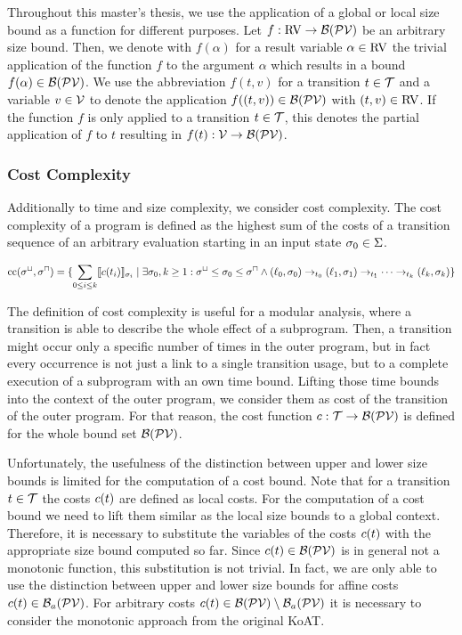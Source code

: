 Throughout this master's thesis, we use the application of a global or local size bound as a function for different purposes.
Let $f: \text{RV} \rightarrow \mathcal{B}(\mathcal{PV})$ be an arbitrary size bound.
Then, we denote with $f(\alpha)$ for a result variable $\alpha \in \text{RV}$ the trivial application of the function $f$ to the argument $\alpha$ which results in a bound $f(\alpha) \in \mathcal{B}(\mathcal{PV})$.
We use the abbreviation $f(t, v)$ for a transition $t \in \mathcal{T}$ and a variable $v \in \mathcal{V}$ to denote the application $f((t,v)) \in \mathcal{B}(\mathcal{PV})$ with $(t,v) \in \text{RV}$.
If the function $f$ is only applied to a transition $t \in \mathcal{T}$, this denotes the partial application of $f$ to $t$ resulting in $f(t): \mathcal{V} \rightarrow \mathcal{B}(\mathcal{PV})$.

\subsubsection{Cost Complexity}

Additionally to time and size complexity, we consider cost complexity.
The cost complexity of a program is defined as the highest sum of the costs of a transition sequence of an arbitrary evaluation starting in an input state $\sigma_0 \in \Sigma$.

\begin{definition}
\[ \text{cc}({\sigma^\sqcup}, {\sigma^\sqcap}) = \lbrace  \sum_{0 \leq i \leq k} \llbracket c(t_i) \rrbracket_{\sigma_i} \mid \exists \sigma_0, k \geq 1: \sigma^\sqcup \leq \sigma_0 \leq \sigma^\sqcap \wedge (\ell_0, \sigma_0) \rightarrow_{t_0} (\ell_1, \sigma_1) \rightarrow_{t_1} \dots \rightarrow_{t_k} (\ell_k, \sigma_k)  \rbrace \]
\end{definition}

The definition of cost complexity is useful for a modular analysis, where a transition is able to describe the whole effect of a subprogram.
Then, a transition might occur only a specific number of times in the outer program, but in fact every occurrence is not just a link to a single transition usage, but to a complete execution of a subprogram with an own time bound.
Lifting those time bounds into the context of the outer program, we consider them as cost of the transition of the outer program. 
For that reason, the cost function $c: \mathcal{T} \rightarrow \mathcal{B}(\mathcal{PV})$ is defined for the whole bound set $\mathcal{B}(\mathcal{PV})$.

Unfortunately, the usefulness of the distinction between upper and lower size bounds is limited for the computation of a cost bound.
Note that for a transition $t \in \mathcal{T}$ the costs $c(t)$ are defined as local costs.
For the computation of a cost bound we need to lift them similar as the local size bounds to a global context.
Therefore, it is necessary to substitute the variables of the costs $c(t)$ with the appropriate size bound computed so far.
Since $c(t) \in \mathcal{B}(\mathcal{PV})$ is in general not a monotonic function, this substitution is not trivial.
In fact, we are only able to use the distinction between upper and lower size bounds for affine costs $c(t) \in \mathcal{B}_a(\mathcal{PV})$.
For arbitrary costs $c(t) \in \mathcal{B}(\mathcal{PV}) \setminus \mathcal{B}_a(\mathcal{PV})$ it is necessary to consider the monotonic approach from the original KoAT.

